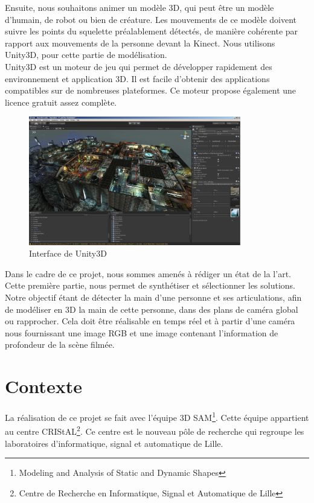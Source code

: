 Ensuite, nous souhaitons animer un modèle 3D, qui peut être un modèle 
d'humain, de robot ou bien de créature. Les mouvements de ce modèle 
doivent suivre les points du squelette préalablement détectés, de 
manière cohérente par rapport aux mouvements de la personne devant la 
Kinect. Nous utilisons Unity3D, pour cette partie de 
modélisation.\\

Unity3D est un moteur de jeu qui permet de développer rapidement des 
environnement et application 3D. Il est facile d'obtenir des 
applications compatibles sur de nombreuses plateformes. Ce moteur 
propose également une licence gratuit assez complète.\\

\begin{figure}[H]
  \begin{center}
    \includegraphics[width=350px]{images/Unity3D.jpg}
    \caption{Interface de Unity3D}
  \end{center}
\end{figure}

Dans le cadre de ce projet, nous sommes amenés à rédiger un état de la 
l'art. Cette première partie, nous permet de synthétiser et sélectionner 
les solutions. Notre objectif étant de détecter la main d'une personne 
et ses articulations, afin de modéliser en 3D la main de 
cette personne, dans des plans de caméra global ou rapprocher. Cela 
doit être réalisable en temps réel et à partir d'une caméra nous 
fournissant une image RGB et une image contenant l'information de 
profondeur de la scène filmée.\\

\section{Contexte}
La réalisation de ce projet se fait avec l'équipe 3D 
SAM\footnote{Modeling and Analysis of Static and Dynamic Shapes}. 
Cette équipe appartient au centre CRIStAL\footnote{Centre de Recherche 
en Informatique, Signal et Automatique de Lille}. Ce centre est le 
nouveau pôle de recherche qui regroupe les laboratoires d'informatique, 
signal et automatique de Lille.\\

